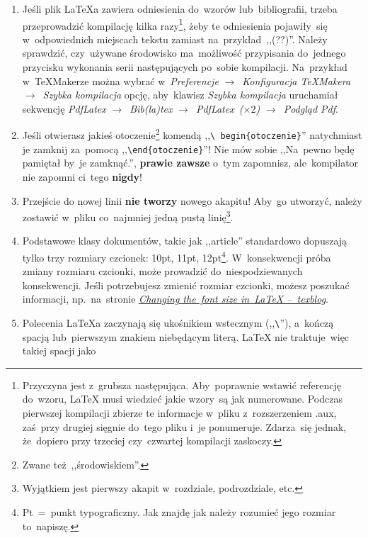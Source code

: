 \documentclass[a4paper,11pt]{article}
\newcommand{\tbs}{\textbackslash}  %
\newcommand{\tb}{\textbf}
\begin{document}
\begin{enumerate}
\item Jeśli plik \LaTeX a zawiera odniesienia do~wzorów
  lub~bibliografii, trzeba przeprowadzić kompilację kilka
  razy\footnote{Przyczyna jest z~grubsza następująca. Aby~poprawnie
    wstawić referencję do~wzoru, \LaTeX{} musi wiedzieć jakie wzory~są
    jak numerowane. Podczas pierwszej kompilacji zbierze te informacje
    w~pliku z~rozszerzeniem .aux, zaś~przy drugiej sięgnie do~tego
    pliku i~je ponumeruje. Zdarza~się jednak, że~dopiero przy trzeciej
    czy~czwartej kompilacji zaskoczy.}, żeby te odniesienia
  pojawiły~się w~odpowiednich miejscach tekstu zamiast
  na~przykład~,,(??)''. Należy sprawdzić, czy~używane środowisko
  ma~możliwość przypisania do~jednego przycisku wykonania serii
  następujących po~sobie kompilacji. Na~przykład w~\TeX Makerze można
  wybrać w~\emph{Preferencje} $\to$~\emph{Konfiguracja \TeX Makera}
  $\to$~\emph{Szybka kompilacja} opcję, aby~klawisz \emph{Szybka
    kompilacja} uruchamiał sekwencję \emph{PdfLatex}
  $\to$~\emph{Bib(la)tex} $\to$~\emph{PdfLatex~($\times 2$)}
  $\to$~\emph{Podgląd Pdf}.
\item Jeśli otwierasz jakieś otoczenie\footnote{Zwane
    też~,,środowiskiem''.} komendą ,,\texttt{\tbs
    begin\{otoczenie\}}'' natychmiast je zamknij za~pomocą
  ,,\texttt{\tbs end\{otoczenie\}}''! Nie mów sobie ,,Na~pewno będę
  pamiętał by~je zamknąć.'', \tb{prawie zawsze} o~tym zapomnisz,
  ale~kompilator nie zapomni ci~tego \tb{nigdy}!
\item Przejście do nowej linii \tb{nie tworzy} nowego akapitu! Aby~go
  utworzyć, należy zostawić w~pliku co~najmniej jedną pustą
  linię\footnote{Wyjątkiem jest pierwszy akapit w~rozdziale,
    podrozdziale, etc.}.
\item Podstawowe klasy dokumentów, takie jak ,,article'' standardowo
  dopuszają tylko trzy rozmiary czcionek: 10pt, 11pt,
  12pt\footnote{Pt~=~punkt typograficzny. Jak znajdę jak należy
    rozumieć jego rozmiar to~napiszę.}. W~konsekwencji próba zmiany
  rozmiaru czcionki, może prowadzić do~niespodziewanych konsekwencji.
  Jeśli potrzebujesz zmienić rozmiar czcionki, możesz poszukać
  informacji, np.~na~stronie
  \href{https://texblog.org/2012/08/29/changing-the-font-size-in-latex/}{\emph{Changing
      the~font size in~LaTeX --~texblog}}.
\item Polecenia \LaTeX a zaczynają się ukośnikiem wstecznym
  (,,\texttt{\tbs}''), a~kończą spacją lub~pierwszym znakiem
  niebędącym literą. \LaTeX{} nie traktuje~więc takiej spacji jako

\end{enumerate}
\end{document}
